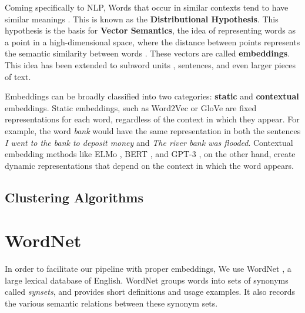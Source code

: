 Coming specifically to NLP, Words that occur in similar contexts tend to have similar meanings \cite{harrisDistributionalStructure1954}. This is 
known as the \textbf{Distributional Hypothesis}. This hypothesis is the basis for \textbf{Vector Semantics}, the idea of representing words as a point
in a high-dimensional space, where the distance between points represents the semantic similarity between words \cite{jm3}. These vectors are called 
\textbf{embeddings}. This idea has been extended to subword units \cite{wuGooglesNeuralMachine2016}, sentences, and even larger pieces of text.

Embeddings can be broadly classified into two categories: \textbf{static} and \textbf{contextual} embeddings. Static embeddings, such as 
Word2Vec \cite{mikolovDistributedRepresentationsWords2013} or GloVe \cite{penningtonGloVeGlobalVectors2014} are fixed representations
for each word, regardless of the context in which they appear. For example, the word \textit{bank} would have the same representation in both the sentences
\textit{I went to the bank to deposit money} and \textit{The river bank was flooded}. Contextual embedding methods like ELMo \cite{petersDeepContextualizedWord2018}, BERT \cite{devlinBERTPretrainingDeep2019}, 
and GPT-3 \cite{brownLanguageModelsAre2020}, on the other hand, create dynamic representations that depend on the context in which the word appears.




\subsection{Clustering Algorithms}

\section{WordNet}
In order to facilitate our pipeline with proper embeddings, We use WordNet \cite{millerWordNetLexicalDatabase1994}, a large lexical database of English.
WordNet groups words into sets of synonyms called \textit{synsets}, and provides short definitions and usage examples. It also records the
various semantic relations between these synonym sets.

